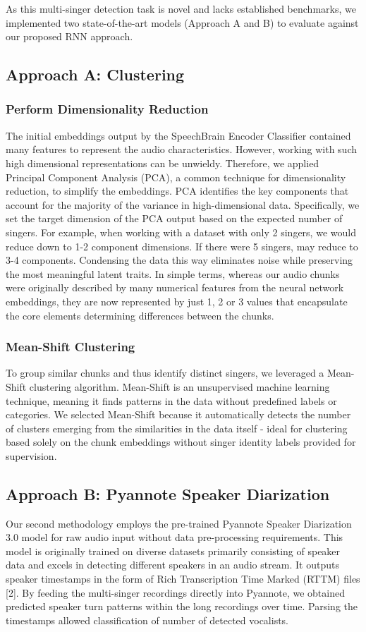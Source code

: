 \documentclass[conference]{IEEEtran}
\begin{document}
As this multi-singer detection task is novel and lacks established benchmarks, we implemented two state-of-the-art models (Approach A and B) to evaluate against our proposed RNN approach.

\subsection{Approach A: Clustering}
\subsubsection{Perform Dimensionality Reduction}
The initial embeddings output by the SpeechBrain Encoder Classifier contained many features to represent the audio characteristics. However, working with such high dimensional representations can be unwieldy. Therefore, we applied Principal Component Analysis (PCA), a common technique for dimensionality reduction, to simplify the embeddings. PCA identifies the key components that account for the majority of the variance in high-dimensional data. Specifically, we set the target dimension of the PCA output based on the expected number of singers. For example, when working with a dataset with only 2 singers, we would reduce down to 1-2 component dimensions. If there were 5 singers, may reduce to 3-4 components. Condensing the data this way eliminates noise while preserving the most meaningful latent traits. In simple terms, whereas our audio chunks were originally described by many numerical features from the neural network embeddings, they are now represented by just 1, 2 or 3 values that encapsulate the core elements determining differences between the chunks.

\subsubsection{Mean-Shift Clustering}
To group similar chunks and thus identify distinct singers, we leveraged a Mean-Shift clustering algorithm. Mean-Shift is an unsupervised machine learning technique, meaning it finds patterns in the data without predefined labels or categories.  We selected Mean-Shift because it automatically detects the number of clusters emerging from the similarities in the data itself - ideal for clustering based solely on the chunk embeddings without singer identity labels provided for supervision.

\subsection{Approach B: Pyannote Speaker Diarization}
Our second methodology employs the pre-trained Pyannote Speaker Diarization 3.0 model for raw audio input without data pre-processing requirements. This model is originally trained on diverse datasets primarily consisting of speaker data and excels in detecting different speakers in an audio stream. It outputs speaker timestamps in the form of Rich Transcription Time Marked (RTTM) files [2]. By feeding the multi-singer recordings directly into Pyannote, we obtained predicted speaker turn patterns within the long recordings over time. Parsing the timestamps allowed classification of number of detected vocalists. 
\end{document}
